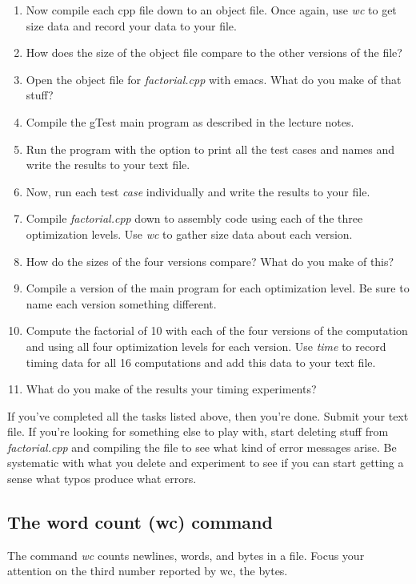 \documentclass[]{tufte-handout}
\begin{document}
\begin{enumerate}
\item Now compile each cpp file down to an object file. Once again, use \textit{wc} to get size data and record your data to your file.

\item How does the size of the object file compare to the other versions of the file?

\item Open the object file for \textit{factorial.cpp} with emacs. What do you make of that stuff?

\item Compile the gTest main program as described in the lecture notes. 

\item Run the program with the option to print all the test cases and names and write the results to your text file.

\item Now, run each test \textit{case} individually and write the results to your file. 

\item Compile \textit{factorial.cpp} down to assembly code using each of the three optimization levels. Use \textit{wc} to gather size data about each version.

\item How do the sizes of the four versions compare? What do you make of this?

\item Compile a version of the main program for each optimization level. Be sure to name each version something different. 

\item Compute the factorial of 10 with each of the four versions of the computation and using all four optimization levels for each version. Use \textit{time} to record timing data for all 16 computations and add this data to your text file.

\item What do you make of the results your timing experiments? 

\end{enumerate}
 
If you've completed all the tasks listed above, then you're done. Submit your text file.  If you're looking for something else to play with, start deleting stuff from \textit{factorial.cpp} and compiling the file to see what kind of error messages arise. Be systematic with what you delete and experiment to see if you can start getting a sense what typos produce what errors.  


\subsection{The word count (wc) command}

The command \textit{wc} counts newlines, words, and bytes in a file. Focus your attention on the third number reported by wc, the bytes.
\end{document}
